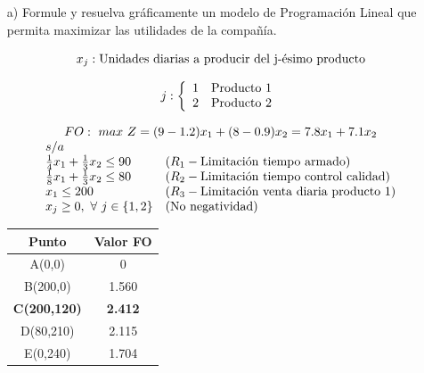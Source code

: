 \documentclass[letterpaper,11pt,oneside]{article}
\begin{document}
\begin{itemize}
	\item[a)] Formule y resuelva gráficamente un modelo de Programación Lineal que permita maximizar las utilidades de la compañía.
	
	\begin{equation*}
	x_{j}:\textup{Unidades diarias a producir del j-ésimo producto}
	\end{equation*}
	
	\begin{equation*}
	j:\left\{
	\begin{array}{l l}
	1 & \textup{Producto 1}\\
	2 & \textup{Producto 2}\\
	\end{array}
	\right.
	\end{equation*}
	
	\renewcommand{\arraystretch}{1.5}
	\begin{equation*}
	\begin{array}{l l}
	\multicolumn{2}{c}{FO:\ max\ Z=(9-1.2)x_{1}+(8-0.9)x_{2}=7.8x_{1}+7.1x_{2}}\\
	s/a & \\
	\frac{1}{4}x_{1}+\frac{1}{3}x_{2}\leq 90 & (R_{1}-\textup{Limitación tiempo armado})\\
	\frac{1}{8}x_{1}+\frac{1}{3}x_{2}\leq 80 & (R_{2}-\textup{Limitación tiempo control calidad})\\
	x_{1}\leq 200 & (R_{3}-\textup{Limitación venta diaria producto 1})\\
	x_{j}\geq 0,\ \forall\ j \in \{1,2\} & (\textup{No negatividad})\\
	\end{array}
	\end{equation*}
	
	\renewcommand{\arraystretch}{1.0}
	\begin{table}[hbt]
		\centering
		\begin{tabular}{c | c}
			\hline\hline
			Punto & Valor FO\\
			\hline
			A(0,0) & 0\\
			B(200,0) & 1.560\\
			\textbf{C(200,120)} & \textbf{2.412}\\
			D(80,210) & 2.115\\
			E(0,240) & 1.704\\
			\hline\hline
		\end{tabular}
	\end{table}
	

\end{itemize}
\end{document}
